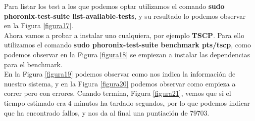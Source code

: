 Para listar los test a los que podemos optar utilizamos el comando \textbf{sudo phoronix-test-suite list-available-tests}, y su resultado lo podemos observar en la Figura \ref{figura17}.\\
Ahora vamos a probar a instalar uno cualquiera, por ejemplo \textbf{TSCP}. Para ello utilizamos el comando \textbf{sudo phoronix-test-suite benchmark pts/tscp}, como podemos observar en la Figura \ref{figura18} se empiezan a instalar las dependencias para el benchmark.\\
En la Figura \ref{figura19} podemos observar como nos indica la información de nuestro sistema, y en la Figura \ref{figura20} podemos observar como empieza a correr pero con errores. Cuando termina, Figura \ref{figura21}, vemos que si el tiempo estimado era 4 minutos ha tardado segundos, por lo que podemos indicar que ha encontrado fallos, y nos da al final una puntiación de 79703.

